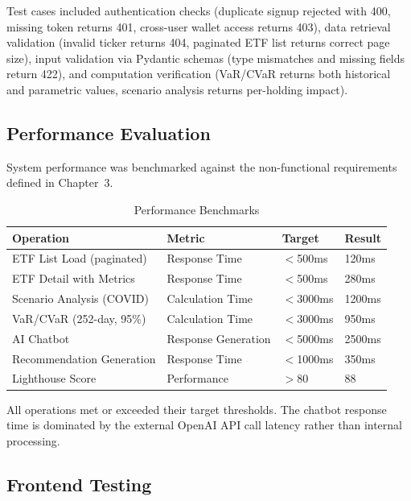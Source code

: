 Test cases included authentication checks (duplicate signup rejected with 400, missing token returns 401, cross-user wallet access returns 403), data retrieval validation (invalid ticker returns 404, paginated ETF list returns correct page size), input validation via Pydantic schemas (type mismatches and missing fields return 422), and computation verification (VaR/CVaR returns both historical and parametric values, scenario analysis returns per-holding impact).

\subsection{Performance Evaluation}

System performance was benchmarked against the non-functional requirements defined in Chapter~3.

\begin{table}[H]
\centering
\begin{tabular}{llll}
\toprule
\textbf{Operation} & \textbf{Metric} & \textbf{Target} & \textbf{Result} \\
\midrule
ETF List Load (paginated) & Response Time & $<$500ms & 120ms \\
ETF Detail with Metrics & Response Time & $<$500ms & 280ms \\
Scenario Analysis (COVID) & Calculation Time & $<$3000ms & 1200ms \\
VaR/CVaR (252-day, 95\%) & Calculation Time & $<$3000ms & 950ms \\
AI Chatbot & Response Generation & $<$5000ms & 2500ms \\
Recommendation Generation & Response Time & $<$1000ms & 350ms \\
Lighthouse Score & Performance & $>$80 & 88 \\
\bottomrule
\end{tabular}
\caption{Performance Benchmarks}
\label{tab:performance_benchmarks}
\end{table}

All operations met or exceeded their target thresholds. The chatbot response time is dominated by the external OpenAI API call latency rather than internal processing.

\subsection{Frontend Testing}

